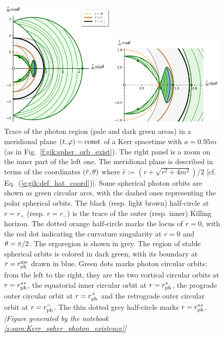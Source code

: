 \begin{figure}
\parbox[c]{0.49\textwidth}{\includegraphics[width=0.49\textwidth]{gik_spo_meridional.pdf}}
\parbox[c]{0.49\textwidth}{\includegraphics[width=0.49\textwidth]{gik_spo_meridional_zoom.pdf}}
\caption[]{\label{f:gik:spo_meridional} \footnotesize
Trace of the photon region (pale and dark green areas) in
a meridional plane $(t,\varphi)=\mathrm{const}$ of
a Kerr spacetime with $a = 0.95 m$ (as in Fig.~\ref{f:gik:spher_orb_exist}).
The right panel is a zoom on the inner part of the left one.
The meridional plane is described in terms of the coordinates $(\hat{r},\theta)$
where $\hat{r} := (r + \sqrt{r^2 + 4m^2})/2$ [cf. Eq.~(\ref{e:gik:def_hat_coord})].
Some spherical photon orbits are shown as green circular arcs,
with the dashed ones representing the polar spherical orbits.
The black (resp. light brown) half-circle at $r=r_+$ (resp. $r=r_-$)
is the trace of the outer (resp. inner) Killing horizon.
The dotted orange half-circle marks the locus of $r=0$, with the
red dot indicating the curvature singularity at $r=0$ and $\theta=\pi/2$.
The ergoregion is shown in grey. The region of stable spherical orbits is
colored in dark green, with its boundary at $r=r_{\rm ph}^{\rm ms}$ drawn in blue.
Green dots marks photon circular orbits: from the left to the right, they
are the two vortical circular orbits at $r=r_{\rm ph}^{**}$, the equatorial
inner circular orbit at $r=r_{\rm ph}^*$, the prograde outer circular orbit
at $r=r_{\rm ph}^+$ and the retrograde outer circular orbit at $r=r_{\rm ph}^-$.
The thin dotted grey half-circle marks $r=r_{\rm ph}^{**}$.
\textsl{[Figure generated by the notebook \ref{s:sam:Kerr_spher_photon_existence}]}
}
\end{figure}


